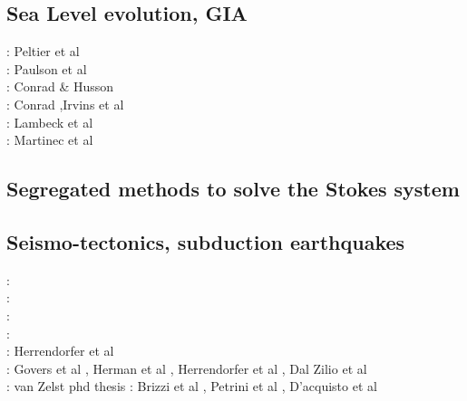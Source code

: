 \subsection{Sea Level evolution, GIA}

\begin{scriptsize}
\nineteenseventyeight: Peltier et al \cite{pefc78}\\
\twothousandseven: Paulson et al \cite{pazw07}\\
\twothousandnine: Conrad \& Husson \cite{cohu09}\\
\twothousandthirteen: Conrad \cite{conr13},Irvins et al \cite{ivjw13}\\
\twothousandfourteen: Lambeck et al \cite{larp14}\\
\twothousandeighteen: Martinec et al \cite{makv18}
\end{scriptsize}

\subsection{Segregated methods to solve the Stokes system}

\begin{scriptsize}
\cite{raju91}
\cite{haeh93}
\cite{leru95}
\cite{duto98}
\cite{wade03}
\cite{wade04}
\cite{utne08}
\end{scriptsize}

\subsection{Seismo-tectonics, subduction earthquakes}

\begin{scriptsize}
\twothousandthree: \cite{bocs03}\\
\twothousandtwelve: \cite{wahh12}\\
\twothousandthirteen: \cite{vagd13a,vagd13b}\cite{milp13}\cite{myhi13}\\
\twothousandfourteen: \cite{vamd14}\\
\twothousandfifteen: Herrendorfer et al \cite{hevg15}\\
\twothousandeighteen: Govers et al \cite{gofv18}, Herman et al \cite{hefg18}, Herrendorfer et al \cite{hegv18}, Dal Zilio et al \cite{davg18}\\
\twothousandnineteen: \cite{vawg19} van Zelst phd thesis \cite{vanzelst}
\twothousandtwenty: Brizzi et al \cite{brvf20}, Petrini et al \cite{pegy20}, D'acquisto et al \cite{dadm20}
\end{scriptsize}


